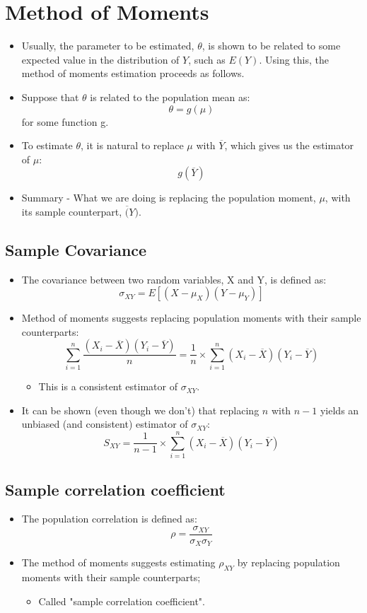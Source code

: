 \documentclass[11pt,a4paper]{report}
\begin{document}
\section{Method of Moments}
\begin{itemize}
    \item Usually, the parameter to be estimated, $\theta$, is shown to be related to some expected value in the distribution of $Y$, such as $E(Y)$. Using this, the method of moments estimation proceeds as follows.
    \item Suppose that $\theta$ is related to the population mean as:
    \[\theta = g(\mu)\] for some function g.
    \item To estimate $\theta$, it is natural to replace $\mu$ with $\overline{Y}$, which gives us the estimator of $\mu$:
    \[g(\overline{Y})\]
    \item Summary - What we are doing is replacing the population moment, $\mu$, with its sample counterpart, $\overline(Y)$.
\end{itemize}
\subsection{Sample Covariance}
\begin{itemize}
    \item The covariance between two random variables, X and Y, is defined as:
    \[\sigma_{XY} = E[(X-\mu_X)(Y - \mu_Y)]\]
    \item Method of moments suggests replacing population moments with their sample counterparts:
    \[\sum_{i=1}^{n}\frac{(X_i - \overline{X})(Y_i-\overline{Y})}{n} = \frac{1}{n}\times \sum_{i=1}^{n}(X_i - \overline{X})(Y_i - \overline{Y})\]
    \begin{itemize}
        \item This is a consistent estimator of $\sigma_{XY}$.
    \end{itemize}
    \item It can be shown (even though we don't) that replacing $n$ with $n-1$ yields an unbiased (and consistent) estimator of $\sigma_{XY}$:
    \[S_{XY} = \frac{1}{n-1} \times \sum_{i=1}^{n} (X_i - \overline{X})(Y_i - \overline{Y})\]
\end{itemize}
\subsection{Sample correlation coefficient}
\begin{itemize}
    \item The population correlation is defined as:
    \[\rho = \frac{\sigma_{XY}}{\sigma_X\sigma_Y}\]
    \item The method of moments suggests estimating $\rho_{XY}$ by replacing population moments with their sample counterparts;
    \begin{itemize}
        \item Called "sample correlation coefficient".
    \end{itemize}
\end{itemize}
\end{document}
